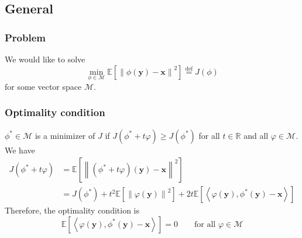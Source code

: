 \documentclass[a4paper,10pt]{article}
\theoremstyle{definition} %
\theoremstyle{definition} %
\theoremstyle{definition} %
\theoremstyle{definition} %
\newcommand{\R}{\mathbb{R}}
\newcommand{\E}[1]{\mathbb{E} \left[ {#1} \right] }
\newcommand{\norm}[1]{\left\| #1 \right \|}
\newcommand{\inner}[1]{\left\langle #1 \right\rangle}
\newcommand{\M}{\mathcal{M}}
\newcommand{\x}{\boldsymbol{x}}
\newcommand{\y}{\boldsymbol{y}}
\newcommand{\0}{\boldsymbol{0}}
\newcommand{\eqdef}{\stackrel{\mathrm{def}}{=}}
\begin{document}
\subsection{General}
\subsubsection{Problem}
We would like to solve
\begin{equation}\label{eq:general_problem}
    \min_{\phi \in \M} \E{\norm{\phi(\y) - \x}^2} \eqdef J(\phi)
\end{equation}
for some vector space $\M$. 
\subsubsection{Optimality condition}
$\phi^* \in \M$ is a minimizer of $J$ if $J(\phi^* + t \varphi) \geqslant J(\phi^*)$ for all $t \in \R$ and all $\varphi \in \M$. We have 
\begin{align*}
    J(\phi^* + t \varphi) &= \E{\norm{(\phi^* + t \varphi) (\y) - \x}^2} \\
    &= J(\phi^*) + t^2 \E{\norm{\varphi(\y)}^2} + 2t \E{\inner{\varphi(\y), \phi^*(\y) - \x}} 
\end{align*}
Therefore, the optimality condition is 
\begin{equation}\label{eq:optimality_condition}
    \E{\inner{\varphi(\y), \phi^*(\y) - \x}} = 0 \qquad \mbox{for all } \varphi \in \M
\end{equation}


\end{document}
